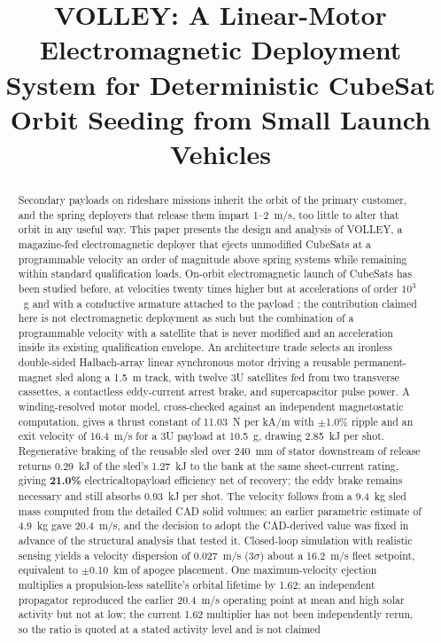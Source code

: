 \documentclass[conference]{IEEEtran}
\begin{document}
\title{VOLLEY: A Linear-Motor Electromagnetic Deployment System for Deterministic CubeSat Orbit Seeding from Small Launch Vehicles}

\author{
}

\maketitle

\begin{abstract}
Secondary payloads on rideshare missions inherit the orbit of the primary customer, and the spring deployers that release them impart 1--2~m/s, too little to alter that orbit in any useful way. This paper presents the design and analysis of VOLLEY, a magazine-fed electromagnetic deployer that ejects unmodified CubeSats at a programmable velocity an order of magnitude above spring systems while remaining within standard qualification loads. On-orbit electromagnetic launch of CubeSats has been studied before, at velocities twenty times higher but at accelerations of order $10^3$~g and with a conductive armature attached to the payload \cite{feng2025}; the contribution claimed here is not electromagnetic deployment as such but the combination of a programmable velocity with a satellite that is never modified and an acceleration inside its existing qualification envelope. An architecture trade selects an ironless double-sided Halbach-array linear synchronous motor driving a reusable permanent-magnet sled along a 1.5~m track, with twelve 3U satellites fed from two transverse cassettes, a contactless eddy-current arrest brake, and supercapacitor pulse power. A winding-resolved motor model, cross-checked against an independent magnetostatic computation, gives a thrust constant of 11.03~N per kA/m with $\pm$1.0\% ripple and an exit velocity of 16.4~m/s for a 3U payload at 10.5~g, drawing 2.85~kJ per shot. Regenerative braking of the reusable sled over 240~mm of stator downstream of release returns 0.29~kJ of the sled's 1.27~kJ to the bank at the same sheet-current rating, giving \textbf{21.0\%} electrical\-to\-payload efficiency net of recovery; the eddy brake remains necessary and still absorbs 0.93~kJ per shot. The velocity follows from a 9.4~kg sled mass computed from the detailed CAD solid volumes; an earlier parametric estimate of 4.9~kg gave 20.4~m/s, and the decision to adopt the CAD-derived value was fixed in advance of the structural analysis that tested it. Closed-loop simulation with realistic sensing yields a velocity dispersion of 0.027~m/s (3$\sigma$) about a 16.2~m/s fleet setpoint, equivalent to $\pm$0.10~km of apogee placement. One maximum-velocity ejection multiplies a propulsion-less satellite's orbital lifetime by 1.62; an independent propagator reproduced the earlier 20.4~m/s operating point at mean and high solar activity but not at low; the current 1.62 multiplier has not been independently rerun, so the ratio is quoted at a stated activity level and is not claimed 
\end{abstract}
\end{document}
